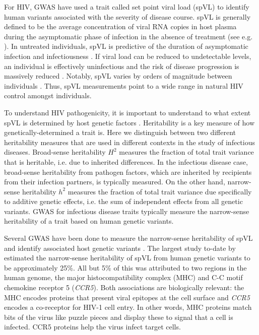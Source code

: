 \documentclass[11pt]{article}
\begin{document}
\begin{linenumbers}
For HIV, GWAS have used a trait called set point viral load (spVL) to identify human variants associated with the severity of disease course. spVL is generally defined to be the average concentration of viral RNA copies in host plasma during the asymptomatic phase of infection in the absence of treatment (see e.g. \cite{Alizon2010}). In untreated individuals, spVL is predictive of the duration of asymptomatic infection \citep{Mellors1996} and infectiousness \citep{Quinn2000}. If viral load can be reduced to undetectable levels, an individual is effectively uninfectious and the risk of disease progression is massively reduced \citep{HHSARTGuidelines2019}. Notably, spVL varies by orders of magnitude between individuals \citep{Mellors1996}. Thus, spVL measurements point to a wide range in natural HIV control amongst individuals. 

To understand HIV pathogenicity, it is important to understand to what extent spVL is determined by host genetic factors \citep{Bartha2013, Dalmasso2008, Fellay2007, Pereyra2010, Fellay2009, Pelak2010, VanManen2011, McLaren2012}. Heritability is a key measure of how genetically-determined a trait is. Here we distinguish between two different heritability measures that are used in different contexts in the study of infectious diseases. Broad-sense heritability $H^2$ measures the fraction of total trait variance that is heritable, i.e. due to inherited differences. In the infectious disease case, broad-sense heritability from pathogen factors, which are inherited by recipients from their infection partners, is typically measured. On the other hand, narrow-sense heritability $h^2$ measures the fraction of total trait variance due specifically to additive genetic effects, i.e. the sum of independent effects from all genetic variants. GWAS for infectious disease traits typically measure the narrow-sense heritability of a trait based on human genetic variants.

Several GWAS have been done to measure the narrow-sense heritability of spVL and identify associated host genetic variants \citep{Bartha2013, Dalmasso2008, Fellay2007, Pereyra2010, Fellay2009, Pelak2010, VanManen2011, McLaren2012}. The largest study to-date by \citet{McLaren2015} estimated the narrow-sense heritability of spVL from human genetic variants to be approximately 25\%. All but 5\% of this was attributed to two regions in the human genome, the major histocompatibility complex (MHC) and C-C motif chemokine receptor 5 (\emph{CCR5}). Both associations are biologically relevant: the MHC encodes proteins that present viral epitopes at the cell surface and \emph{CCR5} encodes a co-receptor for HIV-1 cell entry. In other words, MHC proteins match bits of the virus like puzzle pieces and display these to signal that a cell is infected. CCR5 proteins help the virus infect target cells.


\end{linenumbers}
\end{document}
